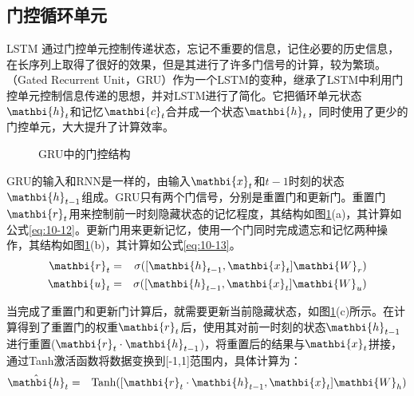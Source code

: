\subsection{门控循环单元}

\parinterval LSTM 通过门控单元控制传递状态，忘记不重要的信息，记住必要的历史信息，在长序列上取得了很好的效果，但是其进行了许多门信号的计算，较为繁琐。{\small{}}（Gated Recurrent Unit，GRU）作为一个LSTM的变种，继承了LSTM中利用门控单元控制信息传递的思想，并对LSTM进行了简化。它把循环单元状态$\mathbi{h}_t$和记忆$\mathbi{c}_t$合并成一个状态$\mathbi{h}_t$，同时使用了更少的门控单元，大大提升了计算效率。

\begin{figure}[htp]
\centering
{}
\caption{GRU中的门控结构}
\label{fig:10-13}
\end{figure}

\parinterval GRU的输入和RNN是一样的，由输入$\mathbi{x}_t$和$t-1$时刻的状态$\mathbi{h}_{t-1}$组成。GRU只有两个门信号，分别是重置门和更新门。重置门$\mathbi{r}_t$用来控制前一时刻隐藏状态的记忆程度，其结构如图\ref{fig:10-13}(a)，其计算如公式\eqref{eq:10-12}。更新门用来更新记忆，使用一个门同时完成遗忘和记忆两种操作，其结构如图\ref{fig:10-13}(b)，其计算如公式\eqref{eq:10-13}。
\begin{eqnarray}
\mathbi{r}_t & = &\sigma ([\mathbi{h}_{t-1},\mathbi{x}_{t}] \mathbi{W}_r ) \label{eq:10-12} \\
\mathbi{u}_t & = & \sigma ([\mathbi{h}_{t-1},\mathbi{x}_{t}] \mathbi{W}_u ) \label{eq:10-13}
\end{eqnarray}

\parinterval 当完成了重置门和更新门计算后，就需要更新当前隐藏状态，如图\ref{fig:10-13}(c)所示。在计算得到了重置门的权重$\mathbi{r}_t$后，使用其对前一时刻的状态$\mathbi{h}_{t-1}$进行重置($\mathbi{r}_t \cdot \mathbi{h}_{t-1}$)，将重置后的结果与$\mathbi{x}_t$拼接，通过Tanh激活函数将数据变换到[-1,1]范围内，具体计算为：
\begin{eqnarray}
\hat{\mathbi{h}}_t &=& \textrm{Tanh} ([\mathbi{r}_t \cdot \mathbi{h}_{t-1},\mathbi{x}_{t}] \mathbi{W}_h )
\label{eq:10-14}
\end{eqnarray}

